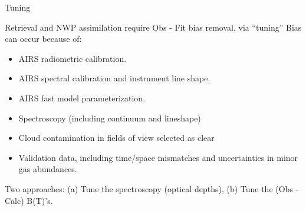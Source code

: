 \documentclass[10pt,t]{beamer}
\begin{document}
\begin{frame}{Tuning}

  \begin{block}{}
  Retrieval and NWP assimilation require Obs - Fit bias removal, via ``tuning'' Bias can occur because of:  
  \end{block}
    
  \begin{itemize}
  \item AIRS radiometric calibration.
  \item AIRS spectral calibration and instrument line shape.
  \item AIRS fast model parameterization.
  \item Spectroscopy (including continuum and lineshape)
  \item Cloud contamination in fields of view selected as clear
  \item Validation data, including time/space mismatches and uncertainties in minor gas abundances.
  \end{itemize}

Two approaches: (a) Tune the spectroscopy (optical depths), (b) Tune the (Obs - Calc) B(T)'s.
  
\end{frame}



\end{document}
